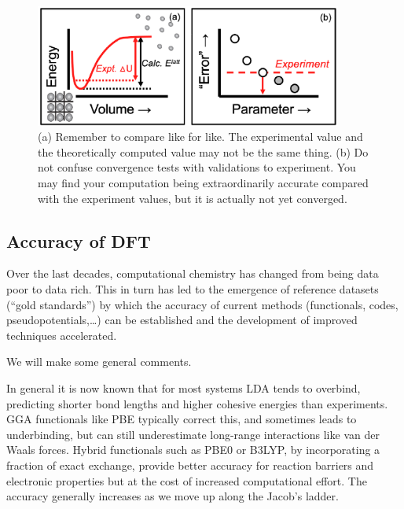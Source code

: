 \documentclass{article}
\theoremstyle{plain}\theoremheaderfont{\normalfont\itshape}\theorembodyfont{\rmfamily}\theoremseparator{.}\newtheorem*{rem}{Remark}\newtheorem*{ex}{Example}\newtheorem*{proof}{Proof}\newtheorem*{altp}{Alternative proof}
\theoremstyle{plain}\theoremheaderfont{\normalfont\bfseries}\theorembodyfont{\rmfamily}\theoremseparator{.}\newtheorem{thm}{Theorem}[section]\newtheorem{lem}[thm]{Lemma}\newtheorem{prop}[thm]{Proposition}\newtheorem*{cor}{Corollary}\newtheorem{defn}[thm]{Definition}\newtheorem{clm}[thm]{Claim}\newtheorem{clminproof}{Claim}\newtheorem{pos}{Postulate}[section]
\theoremstyle{break}\theoremheaderfont{\normalfont\itshape}\theorembodyfont{\rmfamily}\theoremseparator{.\medskip}\newtheorem*{proofskip}{Proof}\newtheorem*{exs}{Examples}\newtheorem*{rems}{Remarks}
\theoremstyle{break}\theoremheaderfont{\normalfont\bfseries}\theorembodyfont{\rmfamily}\theoremseparator{.\medskip}\newtheorem{lemskip}[thm]{Lemma}\newtheorem{defnskip}[thm]{Definition}\newtheorem{propskip}[thm]{Proposition}\newtheorem{thmskip}[thm]{Theorem}
\numberwithin{equation}{section}
\begin{document}
    \begin{figure}
        \centering
        \includegraphics[width=0.9\textwidth]{errors.png}
        \caption{(a) Remember to compare like for like. The experimental value and the theoretically computed value may not be the same thing. (b) Do not confuse convergence tests with validations to experiment. You may find your computation being extraordinarily accurate compared with the experiment values, but it is actually not yet converged.}
    \end{figure}

    \subsection{Accuracy of DFT}
    Over the last decades, computational chemistry has changed from being data poor to data rich. This in turn has led to the emergence of reference datasets (``gold standards'') by which the accuracy of current methods (functionals, codes, pseudopotentials,\dots) can be established and the development of improved techniques accelerated.

    We will make some general comments.

    In general it is now known that for most systems LDA tends to overbind, predicting shorter bond lengths and higher cohesive energies than experiments. GGA functionals like PBE typically correct this, and sometimes leads to underbinding, but can still underestimate long-range interactions like van der Waals forces. Hybrid functionals such as PBE0 or B3LYP, by incorporating a fraction of exact exchange, provide better accuracy for reaction barriers and electronic properties but at the cost of increased computational effort. The accuracy generally increases as we move up along the Jacob's ladder.
\end{document}
